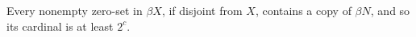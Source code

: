 Every nonempty zero-set in $\beta X$, if disjoint from $X$, contains a copy of $\beta N$, and so its cardinal is at least $2^c$.
